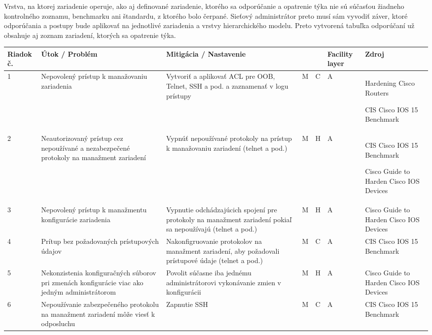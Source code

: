 Vrstva, na ktorej zariadenie operuje, ako aj definované zariadenie, ktorého sa odporúčanie a opatrenie týka nie sú súčasťou žiadneho kontrolného zoznamu, benchmarku ani štandardu, z ktorého bolo čerpané. Sieťový administrátor preto musí sám vyvodiť záver, ktoré odporúčania a postupy bude aplikovať na jednotlivé zariadenia a vrstvy hierarchického modelu. Preto vytvorená tabuľka odporúčaní už obsahuje aj zoznam zariadení, ktorých sa opatrenie týka.

\newpage



\footnotesize
{}
\begin{longtable}[!htbp]{|C{2.5em}L{9em}L{9em}C{2em}C{2.5em}C{7.5em}L{10em}|}
	
	\hline
	\centering
	
	Riadok č.	&Útok / Problém	&Mitigácia / Nastavenie	& 	&	&Facility layer	&Zdroj\\
	\endhead
	
	 1	&Nepovolený prístup k manažovaniu zariadenia	&Vytvoriť a aplikovať ACL pre OOB, Telnet, SSH a pod. a zaznamenať v logu prístupy	&M	&C	&A	&Hardening Cisco Routers \cite{Akin2002}
	
	CIS Cisco IOS 15 Benchmark \cite{CIS_DrTLsgXv24lxeIIM}	\\
	2	&Neautorizovaný prístup cez nepoužívané a nezabezpečené protokoly na manažment zariadení	&Vypnúť nepoužívané protokoly na prístup k manažovaniu zariadení (telnet a pod.)	&M	&H	&A	&CIS Cisco IOS 15 Benchmark \cite{CIS_DrTLsgXv24lxeIIM}
	
	Cisco Guide to Harden Cisco IOS Devices \cite{Singh2018}
	\\
	 3	&Nepovolený prístup k manažmentu konfigurácie zariadenia	&Vypnutie odchádzajúcich spojení pre protokoly na manažment zariadení pokiaľ sa nepoužívajú (telnet a pod.)	&M	&H	&A	&Cisco Guide to Harden Cisco IOS Devices \cite{Singh2018}	\\
	4	&Prítup bez požadovaných prístupových údajov	&Nakonfigruovanie protokolov na manažment zariadení, aby požadovali prístupové údaje (telnet a pod.)	&M	&C	&A	&CIS Cisco IOS 15 Benchmark \cite{CIS_DrTLsgXv24lxeIIM}	\\
	 5	&Nekonzistenia konfiguračných súborov pri zmenách konfigurácie viac ako jedným administrátorom	&Povolit súčasne iba jednému administrátorovi vykonávanie zmien v konfigurácii	&M	&H	&A	&Cisco Guide to Harden Cisco IOS Devices \cite{Singh2018}	\\
	6	&Nepoužívanie zabezpečeného protokolu na manažment zariadení môže viesť k odposluchu	&Zapnutie SSH	&M	&C	&A	&CIS Cisco IOS 15 Benchmark \cite{CIS_DrTLsgXv24lxeIIM}
	

\end{longtable}

